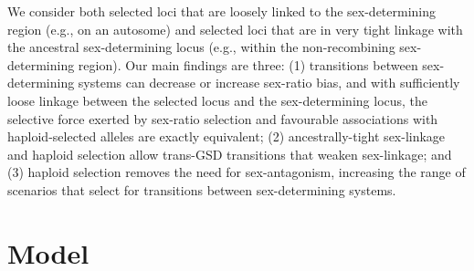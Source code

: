 \documentclass[10pt,letterpaper]{article}
\begin{document}
We consider both selected loci that are loosely linked to the sex-determining region (e.g., on an autosome) and selected loci that are in very tight linkage with the ancestral sex-determining locus (e.g., within the non-recombining sex-determining region).
Our main findings are three:
(1) transitions between sex-determining systems can decrease or increase sex-ratio bias, and with sufficiently loose linkage between the selected locus and the sex-determining locus, the selective force exerted by sex-ratio selection and favourable associations with haploid-selected alleles are exactly equivalent;
(2) ancestrally-tight sex-linkage and haploid selection allow trans-GSD transitions that weaken sex-linkage; and
(3) haploid selection removes the need for sex-antagonism, increasing the range of scenarios that select for transitions between sex-determining systems.

\section*{Model}
\end{document}
